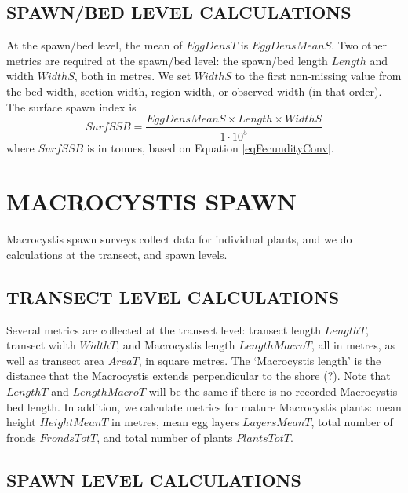 \documentclass[12pt]{article}
\begin{document}
\subsection{SPAWN/BED LEVEL CALCULATIONS}

At the spawn/bed level, the mean of $EggDensT$ is $EggDensMeanS$.
Two other metrics are required at the spawn/bed level: the spawn/bed length $Length$ and width $WidthS$, both in metres.
We set $WidthS$ to the first non-missing value from the bed width, section width, region width, or observed width (in that order).
The surface spawn index is
\begin{equation}
SurfSSB = \frac{EggDensMeanS \times Length \times WidthS} {1 \cdot 10^{5}}
\label{eqBiomassSurf}
\end{equation}
where $SurfSSB$ is in tonnes, based on Equation \ref{eqFecundityConv}.

\section{MACROCYSTIS SPAWN}

Macrocystis spawn surveys collect data for individual plants, and we do calculations at the transect, and spawn levels.

\subsection{TRANSECT LEVEL CALCULATIONS}

Several metrics are collected at the transect level: transect length $LengthT$, transect width $WidthT$, and Macrocystis length $LengthMacroT$, all in metres, as well as transect area $AreaT$, in square metres.
The `Macrocystis length' is the distance that the Macrocystis extends perpendicular to the shore (?).
Note that $LengthT$ and $LengthMacroT$ will be the same if there is no recorded Macrocystis bed length.
In addition, we calculate metrics for mature Macrocystis plants: mean height $HeightMeanT$ in metres, mean egg layers $LayersMeanT$, total number of fronds $FrondsTotT$, and total number of plants $PlantsTotT$.

\subsection{SPAWN LEVEL CALCULATIONS}
\end{document}
